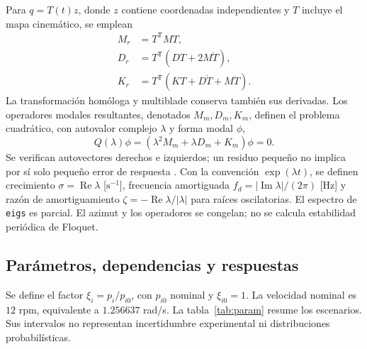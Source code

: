 Para $q=T(t)z$, donde $z$ contiene coordenadas independientes y $T$ incluye el mapa cinemático, se emplean
\begin{align}
M_r&=T^{\mathsf T}MT,\\
D_r&=T^{\mathsf T}(DT+2M\dot T),\\
K_r&=T^{\mathsf T}(KT+D\dot T+M\ddot T).
\end{align}
La transformación homóloga y multiblade conserva también sus derivadas. Los operadores modales resultantes, denotados $M_m,D_m,K_m$, definen el problema cuadrático, con autovalor complejo $\lambda$ y forma modal $\phi$,
\begin{equation}
Q(\lambda)\phi=(\lambda^2M_m+\lambda D_m+K_m)\phi=0.
\end{equation}
Se verifican autovectores derechos e izquierdos; un residuo pequeño no implica por sí solo pequeño error de respuesta \cite{tisseur2001}. Con la convención $\exp(\lambda t)$, se definen crecimiento $\sigma=\operatorname{Re}\lambda$ [$\mathrm{s}^{-1}$], frecuencia amortiguada $f_d=|\operatorname{Im}\lambda|/(2\pi)$ [Hz] y razón de amortiguamiento $\zeta=-\operatorname{Re}\lambda/|\lambda|$ para raíces oscilatorias. El espectro de \texttt{eigs} es parcial. El azimut y los operadores se congelan; no se calcula estabilidad periódica de Floquet.

\subsection{Parámetros, dependencias y respuestas}
Se define el factor $\xi_i=p_i/p_{i0}$, con $p_{i0}$ nominal y $\xi_{i0}=1$. La velocidad nominal es $12$ rpm, equivalente a $1.256637$ rad/s. La tabla~\ref{tab:param} resume los escenarios. Sus intervalos no representan incertidumbre experimental ni distribuciones probabilísticas.

